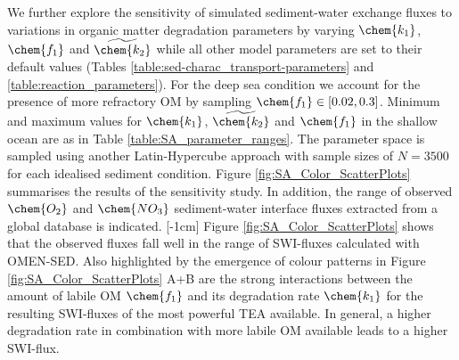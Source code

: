 \documentclass[gmd, manuscript]{copernicus}
\begin{document}
We further explore the sensitivity of simulated sediment-water exchange fluxes to variations in organic matter degradation parameters by varying $\chem{k_1}$, $\chem{f_1}$ and $\widetilde{\chem{k_2}}$ while all other model 
parameters are set to their default values (Tables \ref{table:sed-charac_transport-parameters} and \ref{table:reaction_parameters}). For the deep sea condition we account for the presence of more refractory OM by 
sampling $\chem{f_1} \in [0.02, 0.3]$. Minimum and maximum values for $\chem{k_1}$, $\widetilde{\chem{k_2}}$ and $\chem{f_1}$ in the shallow ocean are as in Table \ref{table:SA_parameter_ranges}. 
The parameter space is sampled using another Latin-Hypercube approach with sample sizes of $N=3500$ for each idealised sediment condition. 
Figure \ref{fig:SA_Color_ScatterPlots} summarises the results of the sensitivity study. In addition, the range of observed $\chem{O_2}$ and $\chem{NO_3}$ sediment-water interface 
fluxes extracted from a global database \citep{bohlen_simple_2012} is indicated. 
[-1cm]%
Figure \ref{fig:SA_Color_ScatterPlots} shows that the observed fluxes fall well in the range of SWI-fluxes calculated with OMEN-SED. 
Also highlighted by the emergence of colour patterns in Figure \ref{fig:SA_Color_ScatterPlots} A+B are the strong interactions between the amount of labile OM  $\chem{f_1}$ and 
its degradation rate $\chem{k_1}$ for the resulting SWI-fluxes of the most powerful TEA available. In general, a higher degradation rate in combination with more labile OM available 
leads to a higher SWI-flux. 

\end{document}
